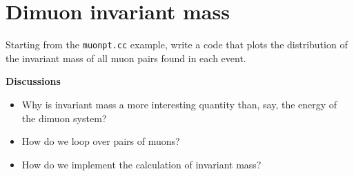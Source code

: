 \documentclass[12pt]{article}
\newenvironment{discussions}{%
\vspace{0.2in}%
\textbf{Discussions}%
\begin{itemize}%
}{%
\end{itemize}%
}
\begin{document}
\section{Dimuon invariant mass}
Starting from the \texttt{muonpt.cc} example, write a code that plots the distribution of the invariant mass of all muon pairs found in each event.

\begin{discussions}
\item Why is invariant mass a more interesting quantity than, say, the energy of the dimuon system?
\item How do we loop over pairs of muons?
\item How do we implement the calculation of invariant mass?
\end{discussions}
\end{document}
